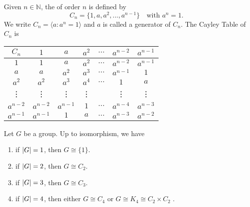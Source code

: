 \begin{eg}\label{eg:cyclic_group_cayley_table}
  Given $n \in \mathbb{N}$, the  of order $n$ is defined by
  \begin{equation*}
    C_n = \{1, a, a^2, ..., a^{n - 1}\} \quad \text{with } a^n = 1.
  \end{equation*}
  We write $C_n = \langle a : a^n = 1 \rangle$ and $a$ is called a generator of $C_n$. The Cayley Table of $C_n$ is
  \begin{center}
    \begin{tabular}{c | c c c c c c}
      $C_n$     & $1$       & $a$       & $a^2$  & $\hdots$ & $a^{n - 2}$ & $a^{n - 1}$ \\
      \hline
      $1$       & $1$       & $a$       & $a^2$  & $\hdots$ & $a^{n - 2}$ & $a^{n - 1}$ \\
      $a$       & $a$       & $a^2$     & $a^3$  & $\hdots$ & $a^{n - 1}$ & $1$ \\
      $a^2$     & $a^2$     & $a^3$     & $a^4$  & $\hdots$ & $1$         & $a$ \\
      \vdots    & \vdots    & \vdots    & \vdots &          & \vdots      & \vdots \\
      $a^{n-2}$ & $a^{n-2}$ & $a^{n-1}$ & $1$    & $\hdots$ & $a^{n-4}$   & $a^{n-3}$ \\
      $a^{n-1}$ & $a^{n-1}$ & $1$       & $a$    & $\hdots$ & $a^{n-3}$   & $a^{n-2}$
    \end{tabular}
  \end{center}
\end{eg}

\begin{propo}\label{propo:small_groups}
  Let $G$ be a group. Up to isomorphism, we have
  \begin{enumerate}
    \item if $\left|G\right| = 1$, then $G \cong \{1\}$.
    \item if $\left|G\right| = 2$, then $G \cong C_2$.
    \item if $\left|G\right| = 3$, then $G \cong C_3$.
    \item if $\left|G\right| = 4$, then either $G \cong C_4$ or $G \cong K_4 \cong C_2 \times C_2$ .
  \end{enumerate}
\end{propo}

